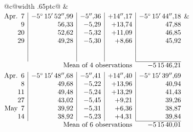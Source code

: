 \noindent\begin{tabular}{@{}c@{\hspace{.4em}\vrule width .65pt\hspace{.4em}}c@{}}
 &
 \\[.18ex]
\(\begin{array}[t]{@{}r|r|r|r|r@{}}
\text{Apr.}\enspace 7 & -5^\circ\,15'\,52''{,}99 & -5''{,}36 & +14''{,}17 & -5^\circ\,15'\,44''{,}18\\
9 & 56{,}33 & -5{,}29 & +13{,}74 & 47{,}88\\
20 & 52{,}62 & -5{,}32 & +11{,}09 & 46{,}85\\
29 & 49{,}28 & -5{,}30 & +8{,}66 & 45{,}92\\
 & & & & \\
 & & & & \\
\cline{5-5}
\multicolumn{4}{r}{\text{Mean of 4 observations}} & -5\,15\,46{,}21
\end{array}\)
&
\(\begin{array}[t]{@{}r|r|r|r|r@{}}
\text{Apr.}\enspace 6 & -5^\circ\,15'\,48''{,}68 & -5''{,}41 & +14''{,}40 & -5^\circ\,15'\,39''{,}69\\
8 & 49{,}68 & -5{,}22 & +13{,}96 & 40{,}94\\
11 & 49{,}48 & -5{,}24 & +13{,}29 & 41{,}43\\
27 & 43{,}02 & -5{,}45 & +9{,}21 & 39{,}26\\
\text{May}\enspace 7 & 39{,}92 & -5{,}31 & +6{,}36 & 38{,}87\\
14 & 38{,}92 & -5{,}23 & +4{,}31 & 39{,}84\\
\cline{5-5}
\multicolumn{4}{r}{\text{Mean of 6 observations}} & -5\,15\,40{,}01
\end{array}\)
\end{tabular}\par\medskip
